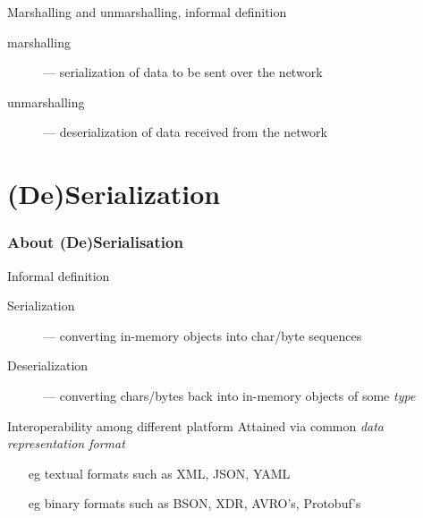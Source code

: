 \documentclass{beamer}\mode<presentation>{\usetheme{AMSBolognaFC}}
\begin{document}
\begin{frame}[allowframebreaks]
    \begin{block}{Marshalling and unmarshalling, informal definition}
        \begin{description}
            \item[marshalling] --- serialization of data to be sent over the network

            \item[unmarshalling] --- deserialization of data received from the network
        \end{description}
    \end{block}

\end{frame}

\section{(De)Serialization}

\begin{frame}[allowframebreaks]
    \frametitle{About (De)Serialisation}

    \begin{block}{Informal definition}
        \begin{description}
            \item[Serialization] --- converting in-memory objects into char/byte sequences
            \item[Deserialization] --- converting chars/bytes back into in-memory objects of some \emph{type}
        \end{description}
    \end{block}

    \bigskip

    \begin{alertblock}{Interoperability among different platform}
        Attained via common \emph{data representation format}
        \begin{itemize}
            \item[eg] textual formats such as XML, JSON, YAML
            \item[eg] binary formats such as BSON, XDR, AVRO's, Protobuf's
        \end{itemize}
    \end{alertblock}

\end{frame}
\end{document}
